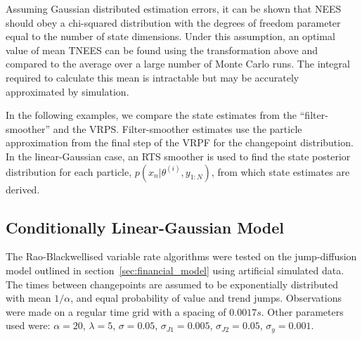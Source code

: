 \documentclass[10pt,twocolumn,twoside]{IEEEtran}
\begin{document}
Assuming Gaussian distributed estimation errors, it can be shown that NEES should obey a chi-squared distribution with the degrees of freedom parameter equal to the number of state dimensions. Under this assumption, an optimal value of mean TNEES can be found using the transformation above and compared to the average over a large number of Monte Carlo runs. The integral required to calculate this mean is intractable but may be accurately approximated by simulation.

In the following examples, we compare the state estimates from the ``filter-smoother'' \cite{Kitagawa1996} and the VRPS. Filter-smoother estimates use the particle approximation from the final step of the VRPF for the changepoint distribution. In the linear-Gaussian case, an RTS smoother is used to find the state posterior distribution for each particle, $p(x_n|\theta^{(i)}, y_{1:N})$, from which state estimates are derived.





\subsection{Conditionally Linear-Gaussian Model} \label{sec:finance}

The Rao-Blackwellised variable rate algorithms were tested on the jump-diffusion model outlined in section~\ref{sec:financial_model} using artificial simulated data. The times between changepoints are assumed to be exponentially distributed with mean $1/\alpha$, and equal probability of value and trend jumps. Observations were made on a regular time grid with a spacing of $0.0017s$. Other parameters used were: $\alpha = 20$, $\lambda = 5$, $\sigma = 0.05$, $\sigma_{J1} = 0.005$, $\sigma_{J2} = 0.05$, $\sigma_{y} = 0.001$.
\end{document}
